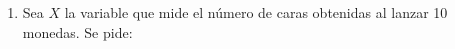 \begin{enumerate}[leftmargin=*]

\item Sea $X$ la variable que mide el número de caras obtenidas al lanzar 10 monedas. 
Se pide:
\begin{enumerate}


\end{enumerate}
\end{enumerate}
